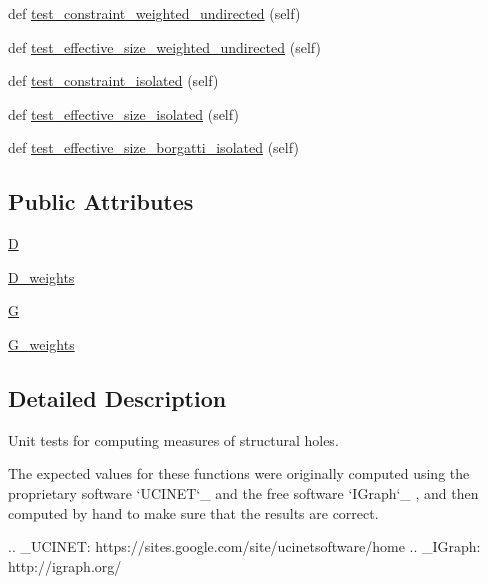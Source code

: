 \begin{DoxyCompactItemize}
\item 
def \hyperlink{classnetworkx_1_1algorithms_1_1tests_1_1test__structuralholes_1_1TestStructuralHoles_aff77bdbea6c022097ac7703e5ac569d2}{test\+\_\+constraint\+\_\+weighted\+\_\+undirected} (self)
\item 
def \hyperlink{classnetworkx_1_1algorithms_1_1tests_1_1test__structuralholes_1_1TestStructuralHoles_ab8bc67d2729b2c7300354e9064a18fd2}{test\+\_\+effective\+\_\+size\+\_\+weighted\+\_\+undirected} (self)
\item 
def \hyperlink{classnetworkx_1_1algorithms_1_1tests_1_1test__structuralholes_1_1TestStructuralHoles_a50e7c08dd221b3452999aa1c101d4b42}{test\+\_\+constraint\+\_\+isolated} (self)
\item 
def \hyperlink{classnetworkx_1_1algorithms_1_1tests_1_1test__structuralholes_1_1TestStructuralHoles_aa5ae4e9e9e0e21729bc70cea8903aa7a}{test\+\_\+effective\+\_\+size\+\_\+isolated} (self)
\item 
def \hyperlink{classnetworkx_1_1algorithms_1_1tests_1_1test__structuralholes_1_1TestStructuralHoles_a47492826e4afc7401cf20532228d5947}{test\+\_\+effective\+\_\+size\+\_\+borgatti\+\_\+isolated} (self)
\end{DoxyCompactItemize}
\subsection*{Public Attributes}
\begin{DoxyCompactItemize}
\item 
\hyperlink{classnetworkx_1_1algorithms_1_1tests_1_1test__structuralholes_1_1TestStructuralHoles_a53bb59f27e78e30776f0b35eb4aec13b}{D}
\item 
\hyperlink{classnetworkx_1_1algorithms_1_1tests_1_1test__structuralholes_1_1TestStructuralHoles_ad857a1d9c7f60994759333984a1359c7}{D\+\_\+weights}
\item 
\hyperlink{classnetworkx_1_1algorithms_1_1tests_1_1test__structuralholes_1_1TestStructuralHoles_a24a620a5bd2eb4059fe5dd9fa541ff98}{G}
\item 
\hyperlink{classnetworkx_1_1algorithms_1_1tests_1_1test__structuralholes_1_1TestStructuralHoles_a0130731cd2bd4e10c5474070852de77d}{G\+\_\+weights}
\end{DoxyCompactItemize}


\subsection{Detailed Description}
\begin{DoxyVerb}Unit tests for computing measures of structural holes.

The expected values for these functions were originally computed using the
proprietary software `UCINET`_ and the free software `IGraph`_ , and then
computed by hand to make sure that the results are correct.

.. _UCINET: https://sites.google.com/site/ucinetsoftware/home
.. _IGraph: http://igraph.org/\end{DoxyVerb}
 

